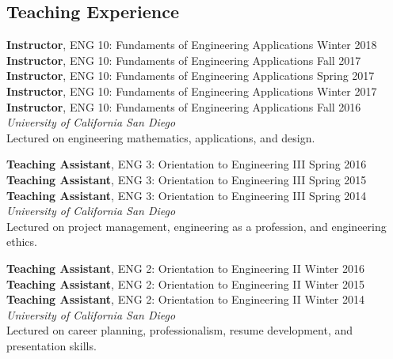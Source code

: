 \documentclass[10pt]{res}
\begin{document}
\begin{resume}



\section{Teaching Experience}
\vspace{0.1in}

\textbf{Instructor}, ENG 10: Fundaments of Engineering Applications \hfill Winter 2018 \\
\textbf{Instructor}, ENG 10: Fundaments of Engineering Applications \hfill Fall 2017 \\
\textbf{Instructor}, ENG 10: Fundaments of Engineering Applications \hfill Spring 2017 \\
\textbf{Instructor}, ENG 10: Fundaments of Engineering Applications \hfill Winter 2017 \\
\textbf{Instructor}, ENG 10: Fundaments of Engineering Applications \hfill Fall 2016 \\
\textit{University of California San Diego} \\
Lectured on engineering mathematics, applications, and design.

\textbf{Teaching Assistant}, ENG 3: Orientation to Engineering III \hfill Spring 2016 \\
\textbf{Teaching Assistant}, ENG 3: Orientation to Engineering III \hfill Spring 2015 \\
\textbf{Teaching Assistant}, ENG 3: Orientation to Engineering III \hfill Spring 2014 \\
\textit{University of California San Diego} \\
Lectured on project management, engineering as a profession, and engineering ethics.

\textbf{Teaching Assistant}, ENG 2: Orientation to Engineering II \hfill Winter 2016 \\
\textbf{Teaching Assistant}, ENG 2: Orientation to Engineering II \hfill Winter 2015 \\
\textbf{Teaching Assistant}, ENG 2: Orientation to Engineering II \hfill Winter 2014 \\
\textit{University of California San Diego} \\
Lectured on career planning, professionalism, resume development, and presentation skills.


\end{resume}
\end{document}
